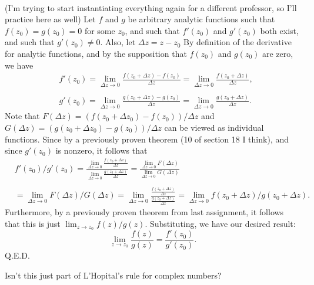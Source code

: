 \documentclass{article}
\theoremstyle{definition}
\newcommand{\cs}[1]{\color{blue}{#1}\normalcolor}
\begin{document}
\\
 (I'm trying to start instantiating everything again for a different professor, so I'll practice here as well) Let $f$ and $g$ be arbitrary analytic functions such that $f(z_0) = g(z_0) = 0$ for some $z_0$, and such that $f'(z_0)$ and $g'(z_0)$ both exist, and such that $g'(z_0) \ne 0$. Also, let $\Delta z = z- z_0$ By definition of the derivative for analytic functions, and by the supposition that $f(z_0)$ and $g(z_0)$ are zero, we have 
$$\begin{array}{cc}
     &f'(z_0) = \lim_{\Delta z \to 0}\frac{f(z_0 + \Delta z) - f(z_0)}{\Delta z} =\lim_{\Delta z \to 0}\frac{f(z_0 + \Delta z)}{\Delta z}, \\
     & \\
     &g'(z_0) = \lim_{\Delta z \to 0}\frac{g(z_0 + \Delta z) - g(z_0)}{\Delta z} = \lim_{\Delta z \to 0}\frac{g(z_0 + \Delta z)}{\Delta z}.
\end{array} $$
Note that $F(\Delta z) = (f(z_0 + \Delta z_0) - f(z_0))/\Delta z$ and $G(\Delta z) = (g(z_0 + \Delta z_0) - g(z_0))/\Delta z$ can be viewed as individual functions. Since by a previously proven theorem (10 of section 18 I think), and since $g'(z_0)$ is nonzero, it follows that 
$$\begin{array}{cc}
     &  f'(z_0)/g'(z_0) = \frac{\lim_{\Delta z \to 0}\frac{f(z_0 + \Delta z)}{\Delta z}}{\lim_{\Delta z \to 0}\frac{g(z_0 + \Delta z)}{\Delta z}} = \frac{\lim_{\Delta z \to 0}F(\Delta z)}{\lim_{\Delta z\to 0}G(\Delta z)}  \\
     & \\
     & = \lim_{\Delta z \to 0}F(\Delta z)/G(\Delta z) = \lim_{\Delta z \to 0}\frac{\frac{f(z_0 + \Delta z)}{\Delta z}}{\frac{g(z_0 + \Delta z)}{\Delta z}} = \lim_{\Delta z\to 0}f(z_0 + \Delta z)/g(z_0 + \Delta z).
\end{array}$$
Furthermore, by a previously proven theorem from last assignment, it follows that this is just $\lim_{z\to z_0}f(z)/g(z)$. Substituting, we have our desired result:
$$\lim_{z\to z_0}\frac{f(z)}{g(z)} = \frac{f'(z_0)}{g'(z_0)}.$$ Q.E.D.\\
\mathwitch

 Isn't this just part of L'Hopital's rule for complex numbers? \cs{Yes! :)}

\cs{5/5}

\cs{15/15}
\end{document}
